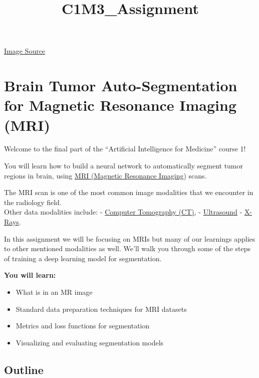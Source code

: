 \documentclass[11pt]{article}
\title{C1M3\_Assignment}
\providecommand{\tightlist}{%
      \setlength{\itemsep}{0pt}\setlength{\parskip}{0pt}}
\begin{document}
    
    
    \maketitle
    
    

    
    \href{https://medium.com/stanford-ai-for-healthcare/its-a-no-brainer-deep-learning-for-brain-mr-images-f60116397472}{Image
Source}

\hypertarget{brain-tumor-auto-segmentation-for-magnetic-resonance-imaging-mri}{%
\section{Brain Tumor Auto-Segmentation for Magnetic Resonance Imaging
(MRI)}\label{brain-tumor-auto-segmentation-for-magnetic-resonance-imaging-mri}}

Welcome to the final part of the ``Artificial Intelligence for
Medicine'' course 1!

You will learn how to build a neural network to automatically segment
tumor regions in brain, using
\href{https://en.wikipedia.org/wiki/Magnetic_resonance_imaging}{MRI
(Magnetic Resonance Imaging}) scans.

The MRI scan is one of the most common image modalities that we
encounter in the radiology field.\\
Other data modalities include: -
\href{https://en.wikipedia.org/wiki/CT_scan}{Computer Tomography (CT)},
- \href{https://en.wikipedia.org/wiki/Ultrasound}{Ultrasound} -
\href{https://en.wikipedia.org/wiki/X-ray}{X-Rays}.

In this assignment we will be focusing on MRIs but many of our learnings
applies to other mentioned modalities as well. We'll walk you through
some of the steps of training a deep learning model for segmentation.

\textbf{You will learn:}

\begin{itemize}
\tightlist
\item
  What is in an MR image
\item
  Standard data preparation techniques for MRI datasets
\item
  Metrics and loss functions for segmentation
\item
  Visualizing and evaluating segmentation models
\end{itemize}

    \hypertarget{outline}{%
\subsection{Outline}\label{outline}}
\end{document}
